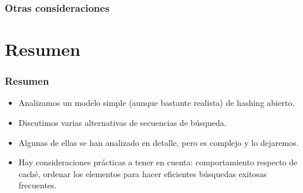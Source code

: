 \documentclass[english, spanish, fleqn,%
hyperref = {colorlinks, urlcolor = blue}%
]{beamer}
\begin{document}
\begin{frame}
  \setcounter{beamerpauses}{2}
  \frametitle{Otras consideraciones}

\end{frame}

\section{Resumen}

\begin{frame}
  \setcounter{beamerpauses}{2}
  \frametitle{Resumen}

  \begin{itemize}
  \item
    Analizamos un modelo simple
    (aunque bastante realista)
    de hashing abierto.
  \item
    Discutimos varias alternativas de secuencias de búsqueda.
  \item
    Algunas de ellas se han analizado en detalle,
    pero es complejo y lo dejaremos.
  \item
    Hay consideraciones prácticas a tener en cuenta:
    comportamiento respecto de caché,
    ordenar los elementos para hacer eficientes búsquedas exitosas frecuentes.
  \end{itemize}
\end{frame}
\end{document}
